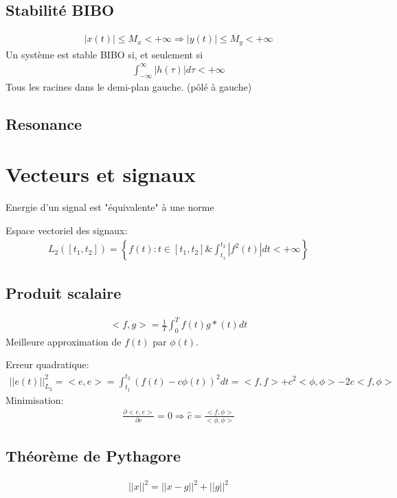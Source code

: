 \documentclass[a4paper]{amsart}
\begin{document}
\subsection{Stabilité BIBO}
\begin{eqnarray}
	|x(t)|\leq M_x<+\infty \Rightarrow |y(t)|\leq M_y<+\infty
\end{eqnarray}
Un système est stable BIBO si, et seulement si
\begin{eqnarray}
	\int_{-\infty}^{\infty}|h(\tau)|d\tau<+\infty
\end{eqnarray}
Tous les racines dans le demi-plan gauche. (pôlé à gauche)

\subsection{Resonance}

\section{Vecteurs et signaux}
Energie d'un signal est "équivalente" à une norme

Espace vectoriel des signaux:
\begin{eqnarray}
	L_2([t_1,t_2])=\left\{f(t):t\in[t_1,t_2]  \& \int_{t_1}^{t_2}|f^2(t)|dt<+\infty\right\}
\end{eqnarray}

\subsection{Produit scalaire}
\begin{eqnarray}
	<f,g>=\frac{1}{T}\int_0^T f(t)g*(t)dt
\end{eqnarray}
Meilleure approximation de $f(t)$ par $\phi(t)$.

Erreur quadratique:
\begin{eqnarray}
	||e(t)||_{L_2}^2=<e,e>=\int_{t_1}^{t_2} (f(t)-c\phi(t))^2dt=<f,f>+c^2<\phi,\phi>-2c<f,\phi>
\end{eqnarray}
Minimisation:
\begin{eqnarray}
	\frac{\partial <e,e>}{\partial c}=0 \Rightarrow \hat c=\frac{<f,\phi>}{<\phi,\phi>}
\end{eqnarray}
\subsection{Théorème de Pythagore}
\begin{eqnarray}
	||x||^2=||x-g||^2+||g||^2
\end{eqnarray}
\end{document}
